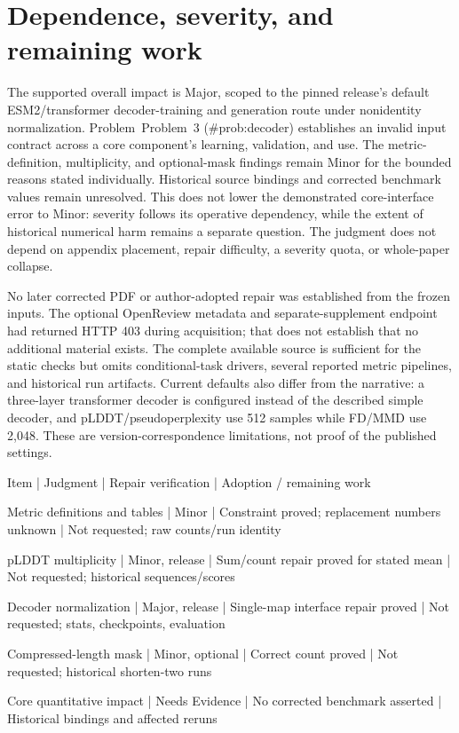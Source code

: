 \documentclass[10pt]{article}
\begin{document}
\section*{Dependence, severity, and remaining work}
The supported overall impact is Major, scoped to the pinned release’s default ESM2/transformer decoder-training and generation route under nonidentity normalization. Problem Problem 3 (\#prob:decoder) establishes an invalid input contract across a core component’s learning, validation, and use. The metric-definition, multiplicity, and optional-mask findings remain Minor for the bounded reasons stated individually. Historical source bindings and corrected benchmark values remain unresolved. This does not lower the demonstrated core-interface error to Minor: severity follows its operative dependency, while the extent of historical numerical harm remains a separate question. The judgment does not depend on appendix placement, repair difficulty, a severity quota, or whole-paper collapse.\par
No later corrected PDF or author-adopted repair was established from the frozen inputs. The optional OpenReview metadata and separate-supplement endpoint had returned HTTP 403 during acquisition; that does not establish that no additional material exists. The complete available source is sufficient for the static checks but omits conditional-task drivers, several reported metric pipelines, and historical run artifacts. Current defaults also differ from the narrative: a three-layer transformer decoder is configured instead of the described simple decoder, and pLDDT/pseudoperplexity use 512 samples while FD/MMD use 2,048. These are version-correspondence limitations, not proof of the published settings.\par
Item | Judgment | Repair verification | Adoption / remaining work\par
Metric definitions and tables | Minor | Constraint proved; replacement numbers unknown | Not requested; raw counts/run identity\par
pLDDT multiplicity | Minor, release | Sum/count repair proved for stated mean | Not requested; historical sequences/scores\par
Decoder normalization | Major, release | Single-map interface repair proved | Not requested; stats, checkpoints, evaluation\par
Compressed-length mask | Minor, optional | Correct count proved | Not requested; historical shorten-two runs\par
Core quantitative impact | Needs Evidence | No corrected benchmark asserted | Historical bindings and affected reruns\par
\end{document}
